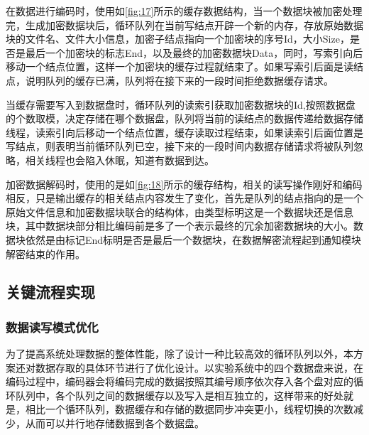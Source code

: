 在数据进行编码时，使用如\autoref{fig:17}所示的缓存数据结构，当一个数据块被加密处理完，生成加密数据块后，循环队列在当前写结点开辟一个新的内存，存放原始数据块的文件名、文件大小信息，加密子结点指向一个加密块的序号Id，大小Size，是否是最后一个加密块的标志End，以及最终的加密数据块Data，同时，写索引向后移动一个结点位置，这样一个加密块的缓存过程就结束了。如果写索引后面是读结点，说明队列的缓存已满，队列将在接下来的一段时间拒绝数据缓存请求。


当缓存需要写入到数据盘时，循环队列的读索引获取加密数据块的Id,按照数据盘的个数取模，决定存储在哪个数据盘，队列将当前的读结点的数据传递给数据存储线程，读索引向后移动一个结点位置，缓存读取过程结束，如果读索引后面位置是写结点，则表明当前循环队列已空，接下来的一段时间内数据存储请求将被队列忽略，相关线程也会陷入休眠，知道有数据到达。


加密数据解码时，使用的是如\autoref{fig:18}所示的缓存结构，相关的读写操作刚好和编码相反，只是输出缓存的相关结点内容发生了变化，首先是队列的结点指向的是一个原始文件信息和加密数据块联合的结构体，由类型标明这是一个数据块还是信息块，其中数据块部分相比编码前是多了一个表示最终的冗余加密数据块的大小。数据块依然是由标记End标明是否是最后一个数据块，在数据解密流程起到通知模块解密结束的作用。
\subsection{关键流程实现}
\subsubsection{数据读写模式优化}
为了提高系统处理数据的整体性能，除了设计一种比较高效的循环队列以外，本方案还对数据存取的具体环节进行了优化设计。以实验系统中的四个数据盘来说，在编码过程中，编码器会将编码完成的数据按照其编号顺序依次存入各个盘对应的循环队列中，各个队列之间的数据缓存以及写入是相互独立的，这样带来的好处就是，相比一个循环队列，数据缓存和存储的数据同步冲突更小，线程切换的次数减少，从而可以并行地存储数据到各个数据盘。


